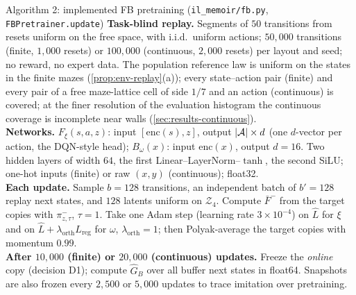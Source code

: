 \begin{algobox}{Algorithm 2: implemented FB pretraining (\texttt{il\_memoir/fb.py}, \texttt{FBPretrainer.update})}
\small
\textbf{Task-blind replay.} Segments of $50$ transitions from resets uniform on the free space, with i.i.d.\ uniform actions; $50{,}000$ transitions (finite, $1{,}000$ resets) or $100{,}000$ (continuous, $2{,}000$ resets) per layout and seed; no reward, no expert data. The population reference law is uniform on the states in the finite mazes (\cref{prop:env-replay}(a)); every state--action pair (finite) and every pair of a free maze-lattice cell of side $1/7$ and an action (continuous) is covered; at the finer resolution of the evaluation histogram the continuous coverage is incomplete near walls (\cref{sec:results-continuous}).\\[2pt]
\textbf{Networks.} $F_\xi(s,a,z)$: input $[\mathrm{enc}(s),z]$, output $\lvert\mathcal{A}\rvert\times d$ (one $d$-vector per action, the DQN-style head); $B_\omega(x)$: input $\mathrm{enc}(x)$, output $d=16$. Two hidden layers of width $64$, the first Linear--LayerNorm--$\tanh$, the second SiLU; one-hot inputs (finite) or raw $(x,y)$ (continuous); float32.\\[2pt]
\textbf{Each update.} Sample $b=128$ transitions, an independent batch of $b'=128$ replay next states, and $128$ latents uniform on $\mathcal Z_4$. Compute $\bar F^-$ from the target copies with $\pi^-_{z,\tau}$, $\tau=1$. Take one Adam step (learning rate $3\times10^{-4}$) on $\hat L$ for $\xi$ and on $\hat L+\lambda_{\mathrm{orth}}L_{\mathrm{reg}}$ for $\omega$, $\lambda_{\mathrm{orth}}=1$; then Polyak-average the target copies with momentum $0.99$.\\[2pt]
\textbf{After $10{,}000$ (finite) or $20{,}000$ (continuous) updates.} Freeze the \emph{online} copy (decision D1); compute $\hat G_B$ over all buffer next states in float64. Snapshots are also frozen every $2{,}500$ or $5{,}000$ updates to trace imitation over pretraining.
\end{algobox}
